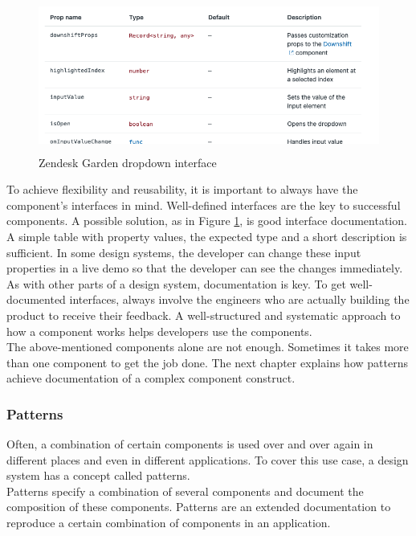 \begin{figure}[hbtp]
	\centerline{\includegraphics[height=5cm]{images/zendesk_component_interface.png}}
	\caption{Zendesk Garden dropdown interface \cite{zendesk_garden_zendesk_nodate}}
	\label{zen_garden_interface}
\end{figure}
To achieve flexibility and reusability, it is important to always have the component's interfaces in mind. Well-defined interfaces are the key to successful components. A possible solution, as in Figure \ref{zen_garden_interface}, is good interface documentation. A simple table with property values, the expected type and a short description is sufficient. In some design systems, the developer can change these input properties in a live demo so that the developer can see the changes immediately.\\

As with other parts of a design system, documentation is key. To get well-documented interfaces, always involve the engineers who are actually building the product to receive their feedback.  A well-structured and systematic approach to how a component works helps developers use the components.  \cite{vesselov_building_2019}\\

The above-mentioned components alone are not enough. Sometimes it takes more than one component to get the job done. The next chapter explains how patterns achieve documentation of a complex component construct. 

\subsubsection{Patterns} \label{patterns}
Often, a combination of certain components is used over and over again in different places and even in different applications. To cover this use case, a design system has a concept called patterns.\\ 
Patterns specify a combination of several components and document the composition of these components. Patterns are an extended documentation to reproduce a certain combination of components in an application. \\

